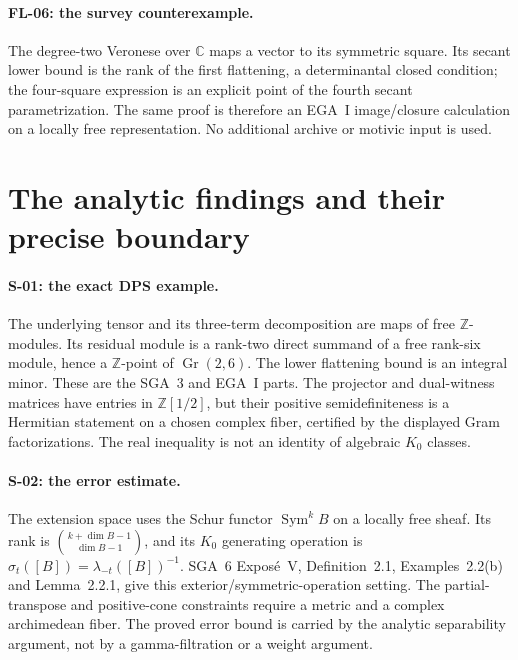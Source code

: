 \paragraph{FL-06: the survey counterexample.}
The degree-two Veronese over $\mathbb C$ maps a vector
to its symmetric square. Its secant lower bound is
the rank of the first flattening, a determinantal
closed condition; the four-square expression is an
explicit point of the fourth secant parametrization.
The same proof is therefore an EGA~I image/closure
calculation on a locally free representation. No
additional archive or motivic input is used.

\section{The analytic findings and their precise boundary}

\paragraph{S-01: the exact DPS example.}
The underlying tensor and its three-term decomposition
are maps of free $\mathbb Z$-modules. Its residual
module is a rank-two direct summand of a free rank-six
module, hence a $\mathbb Z$-point of
$\operatorname{Gr}(2,6)$. The lower flattening bound
is an integral minor. These are the SGA~3 and EGA~I
parts. The projector and dual-witness matrices have
entries in $\mathbb Z[1/2]$, but their positive
semidefiniteness is a Hermitian statement on a chosen
complex fiber, certified by the displayed Gram
factorizations. The real inequality is not an
identity of algebraic $K_0$ classes.

\paragraph{S-02: the error estimate.}
The extension space uses the Schur functor
$\operatorname{Sym}^k B$ on a locally free sheaf.
Its rank is $\binom{k+\dim B-1}{\dim B-1}$, and its
$K_0$ generating operation is
$\sigma_t([B])=\lambda_{-t}([B])^{-1}$.
SGA~6 Expos\'e~V, Definition~2.1, Examples~2.2(b)
and Lemma~2.2.1, give this exterior/symmetric-operation
setting. The partial-transpose and positive-cone
constraints require a metric and a complex
archimedean fiber. The proved error bound is carried
by the analytic separability argument, not by a
gamma-filtration or a weight argument.

